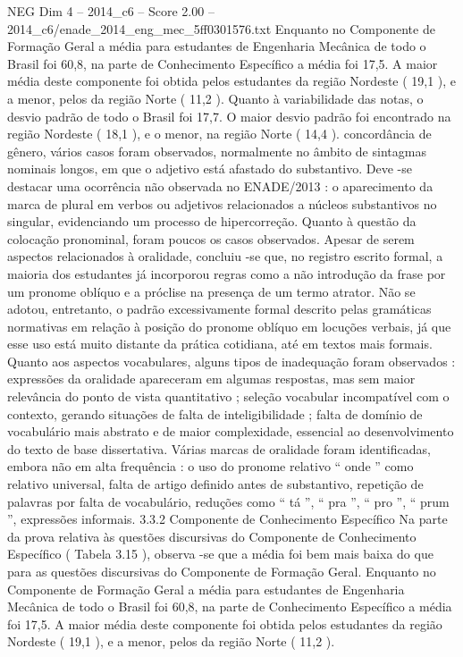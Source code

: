 \begin{textsample}{NEG Dim 4 – 2014\_c6 – Score 2.00 – 2014\_c6/enade\_2014\_eng\_mec\_5ff0301576.txt}
Enquanto no Componente de Formação Geral a média para estudantes de Engenharia Mecânica de todo o Brasil foi 60,8, na parte de Conhecimento Específico a média foi 17,5.
A maior média deste componente foi obtida pelos estudantes da região Nordeste ( 19,1 ), e a menor, pelos da região Norte ( 11,2 ).
Quanto à variabilidade das notas, o desvio padrão de todo o Brasil foi 17,7.
O maior desvio padrão foi encontrado na região Nordeste ( 18,1 ), e o menor, na região Norte ( 14,4 ). concordância de gênero, vários casos foram observados, normalmente no âmbito de sintagmas nominais longos, em que o adjetivo está afastado do substantivo.
Deve -se destacar uma ocorrência não observada no ENADE/2013 : o aparecimento da marca de plural em verbos ou adjetivos relacionados a núcleos substantivos no singular, evidenciando um processo de hipercorreção.
Quanto à questão da colocação pronominal, foram poucos os casos observados.
Apesar de serem aspectos relacionados à oralidade, concluiu -se que, no registro escrito formal, a maioria dos estudantes já incorporou regras como a não introdução da frase por um pronome oblíquo e a próclise na presença de um termo atrator.
Não se adotou, entretanto, o padrão excessivamente formal descrito pelas gramáticas normativas em relação à posição do pronome oblíquo em locuções verbais, já que esse uso está muito distante da prática cotidiana, até em textos mais formais.
Quanto aos aspectos vocabulares, alguns tipos de inadequação foram observados : expressões da oralidade apareceram em algumas respostas, mas sem maior relevância do ponto de vista quantitativo ; seleção vocabular incompatível com o contexto, gerando situações de falta de inteligibilidade ; falta de domínio de vocabulário mais abstrato e de maior complexidade, essencial ao desenvolvimento do texto de base dissertativa.
Várias marcas de oralidade foram identificadas, embora não em alta frequência : o uso do pronome relativo “ onde ” como relativo universal, falta de artigo definido antes de substantivo, repetição de palavras por falta de vocabulário, reduções como “ tá ”, “ pra ”, “ pro ”, “ prum ”, expressões informais. 3.3.2 Componente de Conhecimento Específico Na parte da prova relativa às questões discursivas do Componente de Conhecimento Específico ( Tabela 3.15 ), observa -se que a média foi bem mais baixa do que para as questões discursivas do Componente de Formação Geral.
Enquanto no Componente de Formação Geral a média para estudantes de Engenharia Mecânica de todo o Brasil foi 60,8, na parte de Conhecimento Específico a média foi 17,5.
A maior média deste componente foi obtida pelos estudantes da região Nordeste ( 19,1 ), e a menor, pelos da região Norte ( 11,2 ).

\end{textsample}
